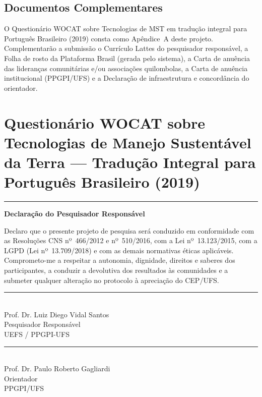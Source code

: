\documentclass[12pt,a4paper,brazil]{article}
\begin{document}
\subsection*{Documentos Complementares}

O Questionário WOCAT sobre Tecnologias de MST em tradução integral para Português Brasileiro (2019) consta como Apêndice~A deste projeto. Complementarão a submissão o Currículo Lattes do pesquisador responsável, a Folha de rosto da Plataforma Brasil (gerada pelo sistema), a Carta de anuência das lideranças comunitárias e/ou associações quilombolas, a Carta de anuência institucional (PPGPI/UFS) e a Declaração de infraestrutura e concordância do orientador.

\newpage
\appendix
\section{Questionário WOCAT sobre Tecnologias de Manejo Sustentável da Terra --- Tradução Integral para Português Brasileiro (2019)}
\label{apendice:wocat}




\vfill
\noindent\rule{\textwidth}{0.4pt}

\vspace{1cm}
\noindent
\textbf{Declaração do Pesquisador Responsável}

\vspace{0.5cm}
\noindent
Declaro que o presente projeto de pesquisa será conduzido em conformidade com as Resoluções CNS nº~466/2012 e nº~510/2016, com a Lei nº~13.123/2015, com a LGPD (Lei nº~13.709/2018) e com as demais normativas éticas aplicáveis. Comprometo-me a respeitar a autonomia, dignidade, direitos e saberes dos participantes, a conduzir a devolutiva dos resultados às comunidades e a submeter qualquer alteração no protocolo à apreciação do CEP/UFS.

\vspace{2cm}

\noindent
\begin{minipage}[t]{0.45\textwidth}
\centering
\rule{6cm}{0.4pt}\\
Prof. Dr. Luiz Diego Vidal Santos\\
Pesquisador Responsável\\
UEFS / PPGPI-UFS
\end{minipage}
\hfill
\begin{minipage}[t]{0.45\textwidth}
\centering
\rule{6cm}{0.4pt}\\
Prof. Dr. Paulo Roberto Gagliardi\\
Orientador\\
PPGPI/UFS
\end{minipage}
\end{document}
